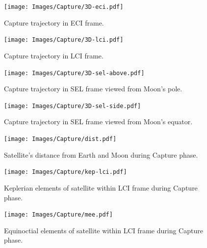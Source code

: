 \begin{figure}
\begin{center}
\texttt{[image: Images/Capture/3D-eci.pdf]}
\end{center}
\caption{Capture trajectory in ECI frame.}
\label{fig:Capture-3D}
\end{figure}

\begin{figure}
\begin{center}
\texttt{[image: Images/Capture/3D-lci.pdf]}
\end{center}
\caption{Capture trajectory in LCI frame.}
\label{fig:Capture-3D-eci}
\end{figure}

\begin{figure}
\begin{center}
\texttt{[image: Images/Capture/3D-sel-above.pdf]}
\end{center}
\caption{Capture trajectory in SEL frame viewed from Moon's pole.}
\label{fig:Capture-3D-sel-above}
\end{figure}

\begin{figure}
\begin{center}
\texttt{[image: Images/Capture/3D-sel-side.pdf]}
\end{center}
\caption{Capture trajectory in SEL frame viewed from Moon's equator.}
\label{fig:Capture-3D-sel-side}
\end{figure}

\begin{figure}
\begin{center}
\texttt{[image: Images/Capture/dist.pdf]}
\end{center}
\caption{Satellite's distance from Earth and Moon during Capture phase.}
\label{fig:Capture-dist}
\end{figure}

\begin{figure}
\begin{center}
\texttt{[image: Images/Capture/kep-lci.pdf]}
\end{center}
\caption{Keplerian elements of satellite within LCI frame during Capture phase.}
\label{fig:Capture-kep-lci}
\end{figure}

\begin{figure}
\begin{center}
\texttt{[image: Images/Capture/mee.pdf]}
\end{center}
\caption{Equinoctial elements of satellite within LCI frame during Capture phase.}
\label{fig:Capture-mee}
\end{figure}

